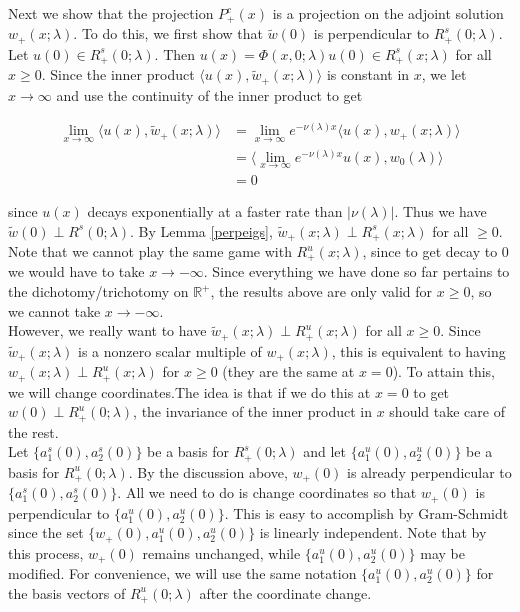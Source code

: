 \documentclass[12pt]{article}
\def\R{{\mathbb R}}
\begin{document}
Next we show that the projection $P^c_+(x)$ is a projection on the adjoint solution $w_+(x; \lambda)$. To do this, we first show that $\tilde{w}(0)$ is perpendicular to $R^s_+(0; \lambda)$. Let $u(0) \in R^s_+(0; \lambda)$. Then $u(x) = \Phi(x, 0; \lambda)u(0) \in R^s_+(x; \lambda)$ for all $x \geq 0$. Since the inner product $\langle u(x), \tilde{w}_+(x; \lambda) \rangle$ is constant in $x$, we let $x \rightarrow \infty$ and use the continuity of the inner product to get

\begin{align*}
\lim_{x \rightarrow \infty} \langle u(x), \tilde{w}_+(x; \lambda) \rangle &= \lim_{x \rightarrow \infty} e^{-\nu(\lambda) x} \langle u(x), w_+(x; \lambda) \rangle \\
&= \langle \lim_{x \rightarrow \infty} e^{-\nu(\lambda) x} u(x), w_0(\lambda) \rangle \\
&= 0
\end{align*}

since $u(x)$ decays exponentially at a faster rate than $|\nu(\lambda)|$. Thus we have $\tilde{w}(0) \perp R^s(0; \lambda)$. By Lemma \ref{perpeigs}, $\tilde{w}_+(x; \lambda) \perp R^s_+(x; \lambda)$ for all $ \geq 0$.\\

Note that we cannot play the same game with $R^u_+(x; \lambda)$, since to get decay to 0 we would have to take $x \rightarrow -\infty$. Since everything we have done so far pertains to the dichotomy/trichotomy on $\R^+$, the results above are only valid for $x \geq 0$, so we cannot take $x \rightarrow -\infty$.\\

However, we really want to have $\tilde{w}_+(x; \lambda) \perp R^u_+(x; \lambda)$ for all $x \geq 0$. Since $\tilde{w}_+(x; \lambda)$ is a nonzero scalar multiple of $w_+(x; \lambda)$, this is equivalent to having $w_+(x; \lambda) \perp R^u_+(x; \lambda)$ for $x \geq 0$ (they are the same at $x = 0$). To attain this, we will change coordinates.The idea is that if we do this at $x = 0$ to get $w(0) \perp R^u_+(0; \lambda)$, the invariance of the inner product in $x$ should take care of the rest.\\

Let $\{ a^s_1(0), a^s_2(0)\}$ be a basis for $R^s_+(0; \lambda)$ and let $\{a^u_1(0), a^u_2(0)\}$ be a basis for $R^u_+(0; \lambda)$. By the discussion above, $w_+(0)$ is already perpendicular to $\{ a^s_1(0), a^s_2(0)\}$. All we need to do is change coordinates so that $w_+(0)$ is perpendicular to $\{ a^u_1(0), a^u_2(0)\}$. This is easy to accomplish by Gram-Schmidt since the set $\{ w_+(0), a^u_1(0), a^u_2(0) \}$ is linearly independent. Note that by this process, $w_+(0)$ remains unchanged, while $\{ a^u_1(0), a^u_2(0) \}$ may be modified. For convenience, we will use the same notation $\{ a^u_1(0), a^u_2(0) \}$ for the basis vectors of $R^u_+(0; \lambda)$ after the coordinate change.\\
\end{document}
